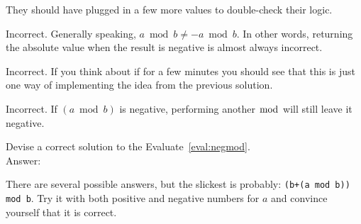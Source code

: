 \begin{eval}
\begin{answer}
\begin{solevalenum}
They should have plugged in a few more values to double-check their logic.
\item
Incorrect. Generally speaking, $a\bmod b \neq -a\bmod b$.  
In other words, returning the absolute value when the result is negative is almost always incorrect.
\item
Incorrect.  If you think about if for a few minutes you should see that this is just 
one way of implementing the idea from the previous solution.
\item
Incorrect.  If $(a\bmod b)$ is negative, performing another $\bmod$ will still leave it negative.
\end{solevalenum}
\end{answer}
\end{eval}

\begin{exer}
Devise a correct solution to the Evaluate~\ref{eval:negmod}.\\
Answer:\\
\vspace*{1.75in}
\begin{answer}
There are several possible answers, but the slickest is probably:
\verb#(b+(a mod b)) mod b#.  Try it with both positive and negative
numbers for $a$ and convince yourself that it is correct.
\end{answer}
\end{exer}



